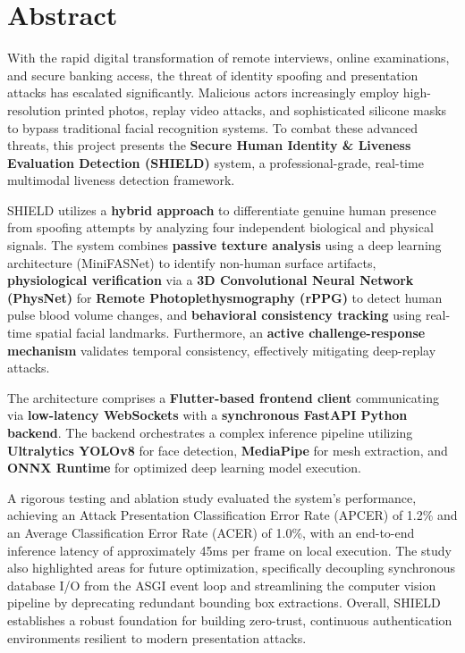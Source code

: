 \documentclass[12pt, a4paper]{report}
\begin{document}
\chapter*{Abstract}
With the rapid digital transformation of remote interviews, online examinations, and secure banking access, the threat of identity spoofing and presentation attacks has escalated significantly. Malicious actors increasingly employ high-resolution printed photos, replay video attacks, and sophisticated silicone masks to bypass traditional facial recognition systems. To combat these advanced threats, this project presents the \textbf{Secure Human Identity \& Liveness Evaluation Detection (SHIELD)} system, a professional-grade, real-time multimodal liveness detection framework.

SHIELD utilizes a \textbf{hybrid approach} to differentiate genuine human presence from spoofing attempts by analyzing four independent biological and physical signals. The system combines \textbf{passive texture analysis} using a deep learning architecture (MiniFASNet) to identify non-human surface artifacts, \textbf{physiological verification} via a \textbf{3D Convolutional Neural Network (PhysNet)} for \textbf{Remote Photoplethysmography (rPPG)} to detect human pulse blood volume changes, and \textbf{behavioral consistency tracking} using real-time spatial facial landmarks. Furthermore, an \textbf{active challenge-response mechanism} validates temporal consistency, effectively mitigating deep-replay attacks.

The architecture comprises a \textbf{Flutter-based frontend client} communicating via \textbf{low-latency WebSockets} with a \textbf{synchronous FastAPI Python backend}. The backend orchestrates a complex inference pipeline utilizing \textbf{Ultralytics YOLOv8} for face detection, \textbf{MediaPipe} for mesh extraction, and \textbf{ONNX Runtime} for optimized deep learning model execution. 

A rigorous testing and ablation study evaluated the system's performance, achieving an Attack Presentation Classification Error Rate (APCER) of 1.2\% and an Average Classification Error Rate (ACER) of 1.0\%, with an end-to-end inference latency of approximately 45ms per frame on local execution. The study also highlighted areas for future optimization, specifically decoupling synchronous database I/O from the ASGI event loop and streamlining the computer vision pipeline by deprecating redundant bounding box extractions. Overall, SHIELD establishes a robust foundation for building zero-trust, continuous authentication environments resilient to modern presentation attacks.
\end{document}

